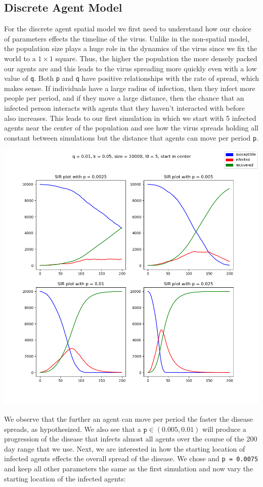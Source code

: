 \documentclass[twoside]{extarticle}                                    %
\numberwithin{equation}{section}                                       %
\begin{document}
\subsection{Discrete Agent Model}
For the discrete agent spatial model we first need to understand how our choice of parameters effects the timeline of the virus. Unlike in the non-spatial model, the population size plays a huge role in the dynamics of the virus since we fix the world to a $1 \times 1$ square. Thus, the higher the population the more densely packed our agents are and this leads to the virus spreading more quickly even with a low value of \texttt{q}. Both \texttt{p} and \texttt{q} have positive relationships with the rate of spread, which makes sense. If individuals have a large radius of infection, then they infect more people per period, and if they move a large distance, then the chance that an infected person interacts with agents that they haven't interacted with before also increases. This leads to our first simulation in which we start with 5 infected agents near the center of the population and see how the virus spreads holding all constant between simulations but the distance that agents can move per period \texttt{p}.
\begin{center}
    \includegraphics[trim = {1.5cm 2cm 0cm 0}, clip, width = 0.55\linewidth]{../plots/startmid.png}
\end{center}
We observe that the further an agent can move per period the faster the disease spreads, as hypothesized. We also see that a $\texttt{p} \in (0.005,0.01)$ will produce a progression of the disease that infects almost all agents over the course of the 200 day range that we use. Next, we are interested in how the starting location of infected agents effects the overall spread of the disease. We chose and \texttt{p = 0.0075} and keep all other parameters the same as the first simulation and now vary the starting location of the infected agents:
\end{document}
